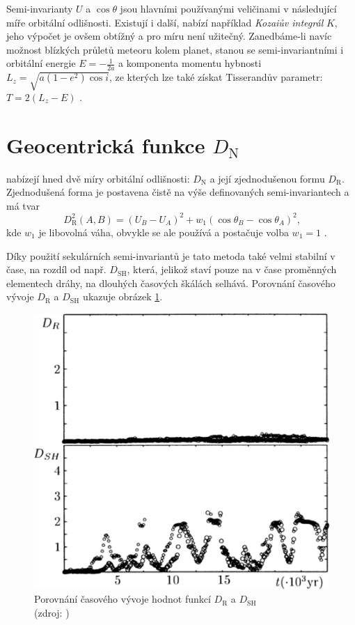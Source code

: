 \medskip

Semi-invarianty $U$ a $\cos{\theta}$ jsou hlavními používanými veličinami v následující míře orbitální odlišnosti. Existují i další, \cite{newapproach} nabízí například \textit{Kozaiův integrál} $K$, jeho výpočet je ovšem obtížný a pro míru není užitečný. Zanedbáme-li navíc možnost blízkých průletů meteoru kolem planet, stanou se semi-invariantními i orbitální energie $E=-\frac{1}{2a}$ a komponenta momentu hybnosti $L_z=\sqrt{a(1-e^2)\cos{i}}$, ze kterých lze také získat Tisserandův parametr: $T=2(L_z-E)$ \cite{newapproach}.

\section{Geocentrická funkce $D_\text{N}$}%
\citeauthor{newapproach} nabízejí hned dvě míry orbitální odlišnosti: $D_\text{N}$ a její zjednodušenou formu $D_\text{R}$. Zjednodušená forma je postavena čistě na výše definovaných semi-invariantech a má tvar \cite{newapproach}
\begin{equation}
    D_\text{R}^2(A,B)=\left( U_B-U_A \right)^2+w_1\left( \cos{\theta_B} - \cos{\theta_A} \right)^2\text{,}
\end{equation}
kde $w_1$ je libovolná váha, obvykle se ale používá a postačuje volba $w_1=1$ \cite{newapproach}\cite{galligan}.

Díky použití sekulárních semi-invariantů je tato metoda také velmi stabilní v čase, na rozdíl od např. $D_\text{SH}$, která, jelikož staví pouze na v čase proměnných elementech dráhy, na dlouhých časových škálách selhává. Porovnání časového vývoje $D_\text{R}$ a $D_\text{SH}$ ukazuje obrázek \ref{img:new:time}.

\begin{figure}[ht]
    \centering
    \includegraphics[width=0.5\linewidth]{img/plots/newapproach-time-evolution.png}
    \caption[Porovnání časového vývoje hodnot funkcí $D_\text{R}$ a $D_\text{SH}$]{
        Porovnání časového vývoje hodnot funkcí $D_\text{R}$ a $D_\text{SH}$\\
        {\small (zdroj: \cite{newapproach})}
    }
    \label{img:new:time}
\end{figure}

